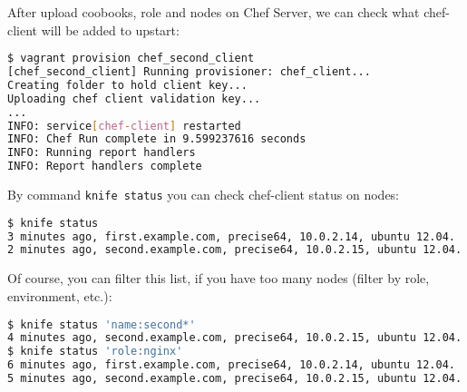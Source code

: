 After upload coobooks, role and nodes on Chef Server, we can check what chef-client will be added to upstart:

\begin{lstlisting}[language=Bash,label=lst:my-server-cloud-knife-ssh9]
$ vagrant provision chef_second_client
[chef_second_client] Running provisioner: chef_client...
Creating folder to hold client key...
Uploading chef client validation key...
...
INFO: service[chef-client] restarted
INFO: Chef Run complete in 9.599237616 seconds
INFO: Running report handlers
INFO: Report handlers complete
\end{lstlisting}

By command \lstinline!knife status! you can check chef-client status on nodes:

\begin{lstlisting}[language=Bash,label=lst:my-server-cloud-knife-ssh10]
$ knife status
3 minutes ago, first.example.com, precise64, 10.0.2.14, ubuntu 12.04.
2 minutes ago, second.example.com, precise64, 10.0.2.15, ubuntu 12.04.
\end{lstlisting}

Of course, you can filter this list, if you have too many nodes (filter by role, environment, etc.):

\begin{lstlisting}[language=Bash,label=lst:my-server-cloud-knife-ssh11]
$ knife status 'name:second*'
4 minutes ago, second.example.com, precise64, 10.0.2.15, ubuntu 12.04.
$ knife status 'role:nginx'
6 minutes ago, first.example.com, precise64, 10.0.2.14, ubuntu 12.04.
5 minutes ago, second.example.com, precise64, 10.0.2.15, ubuntu 12.04.
\end{lstlisting}
